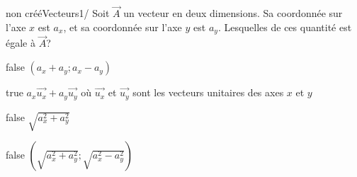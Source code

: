         	\begin{question}{non créé}{Vecteurs}{1}{/}
				Soit $\vec{A}$ un vecteur en deux dimensions. Sa coordonnée sur l'axe $x$ est $a_x$, et sa coordonnée sur l'axe $y$ est $a_y$. Lesquelles de ces quantité est égale à $\vec{A}$?
            \end{question}
            \begin{reponses}
            	\item[false] $(a_x+a_y;a_x-a_y)$
            	\item[true] $a_x\vec{u_x}+a_y\vec{u_y}$ où $\vec{u_x}$ et $\vec{u_y}$ sont les vecteurs unitaires des axes $x$ et $y$
                \item[false] $\sqrt{a_{x}^2+a_{y}^2}$
                \item[false] $(\sqrt{a_{x}^2+a_{y}^2};\sqrt{a_{x}^2-a_{y}^2})$
            \end{reponses}
